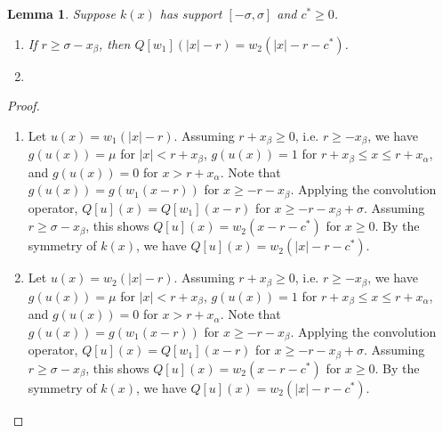 \documentclass[11pt]{article}
\newtheorem{lem}[thm]{Lemma}
\theoremstyle{definition}
\numberwithin{equation}{section}
\numberwithin{thm}{section}
\renewcommand{\a}{\alpha}
\renewcommand{\b}{\beta}
\newcommand{\m}{\mu}
\begin{document}
%



\begin{lem}
Suppose $k(x)$ has support $[-\sigma,\sigma]$ and $c^*\geq0$.

\begin{enumerate}
\item If $r \geq \sigma - x_\b$, then $Q[w_1](|x|-r) = w_2(|x|-r-c^*)$.

\item 
\end{enumerate}
\end{lem}

\begin{proof}
\begin{enumerate}
\item 
Let $u(x) = w_1(|x|-r)$. Assuming $r+x_\b \geq 0$, i.e. $r \geq -x_\b$, we have $g(u(x)) = \m$ for $|x| < r+x_\b$, $g(u(x)) = 1$ for $r+x_\b \leq x \leq r+x_\a$, and $g(u(x)) = 0 $ for $x > r+x_\a$. Note that $g(u(x)) = g(w_1(x-r))$ for $x \geq -r-x_\b$. Applying the convolution operator, $Q[u](x) = Q[w_1](x-r)$ for $x \geq -r-x_\b+\sigma$. Assuming $r \geq \sigma - x_\b$, this shows $Q[u](x) = w_2(x-r-c^*)$ for $x \geq 0$. By the symmetry of $k(x)$, we have $Q[u](x) = w_2(|x|-r-c^*)$.

\item 
Let $u(x) = w_2(|x|-r)$. Assuming $r+x_\b \geq 0$, i.e. $r \geq -x_\b$, we have $g(u(x)) = \m$ for $|x| < r+x_\b$, $g(u(x)) = 1$ for $r+x_\b \leq x \leq r+x_\a$, and $g(u(x)) = 0 $ for $x > r+x_\a$. Note that $g(u(x)) = g(w_1(x-r))$ for $x \geq -r-x_\b$. Applying the convolution operator, $Q[u](x) = Q[w_1](x-r)$ for $x \geq -r-x_\b+\sigma$. Assuming $r \geq \sigma - x_\b$, this shows $Q[u](x) = w_2(x-r-c^*)$ for $x \geq 0$. By the symmetry of $k(x)$, we have $Q[u](x) = w_2(|x|-r-c^*)$.
\end{enumerate}
\end{proof}
\end{document}
